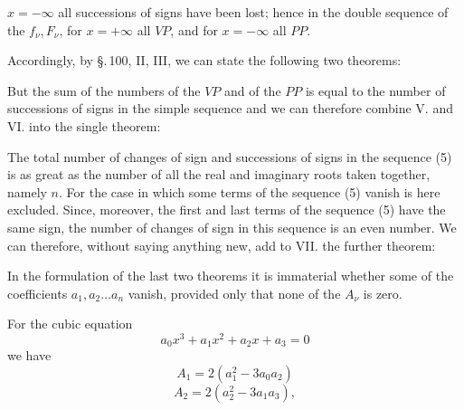 $x = -\infty$ all successions of signs have been lost; hence in the double sequence of the $f_\nu, F_\nu$, for $x = +\infty$ all $VP$, and for $x = -\infty$ all $PP$.

Accordingly, by \S.\,100, II, III, we can state the following two theorems:



But the sum of the numbers of the $VP$ and of the $PP$ is equal to the number of successions of signs in the simple sequence
and we can therefore combine V. and VI. into the single theorem:


The total number of changes of sign and successions of signs in the sequence (5) is as great as the number of all the real and imaginary roots taken together, namely $n$. For the case in which some terms of the sequence (5) vanish is here excluded. Since, moreover, the first and last terms of the sequence (5) have the same sign, the number of changes of sign in this sequence is an even number. We can therefore, without saying anything new, add to VII. the further theorem:


In the formulation of the last two theorems it is immaterial whether some of the coefficients $a_1, a_2 \ldots a_n$ vanish, provided only that none of the $A_\nu$ is zero.

For the cubic equation
\[
a_0 x^3 + a_1 x^2 + a_2 x + a_3 = 0
\]
we have
\[
A_1 = 2(a_1^2 - 3a_0a_2)
\]
\[
A_2 = 2(a_2^2 - 3a_1a_3),
\]
